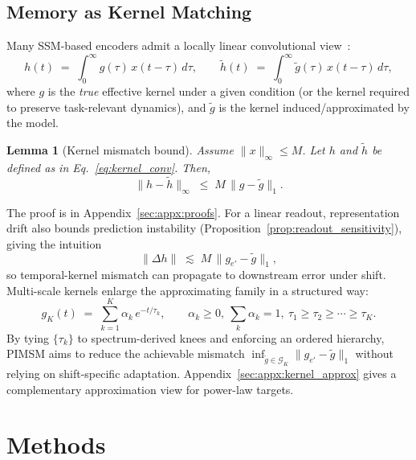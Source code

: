 \documentclass{article}
\newtheorem{lemma}{Lemma}
\begin{document}
\subsection{Memory as Kernel Matching}
\label{sec:theory:kernelbound}

Many SSM-based encoders admit a locally linear convolutional view~\citep{gu2021efficiently,gu2023mamba}:
\begin{equation}
h(t) \;=\; \int_{0}^{\infty} g(\tau)\, x(t-\tau)\, d\tau,
\qquad
\tilde h(t) \;=\; \int_{0}^{\infty} \tilde g(\tau)\, x(t-\tau)\, d\tau,
\label{eq:kernel_conv}
\end{equation}
where $g$ is the \emph{true} effective kernel under a given condition (or the kernel required to preserve task-relevant dynamics), and $\tilde g$ is the kernel induced/approximated by the model.

\begin{lemma}[Kernel mismatch bound]
\label{lem:kernel_mismatch}
Assume $\|x\|_{\infty}\le M$.
Let $h$ and $\tilde h$ be defined as in Eq.~\eqref{eq:kernel_conv}.
Then,
\begin{equation}
\|h - \tilde h\|_{\infty} \;\le\; M\, \|g - \tilde g\|_{1}.
\label{eq:kernel_mismatch_bound}
\end{equation}
\end{lemma}

The proof is in Appendix~\ref{sec:appx:proofs}.
For a linear readout, representation drift also bounds prediction instability (Proposition~\ref{prop:readout_sensitivity}), giving the intuition
\begin{equation}
\|\Delta h\| \;\lesssim\; M\,\|g_{e'} - \tilde g\|_{1},
\label{eq:chain_kernel_to_pred}
\end{equation}
so temporal-kernel mismatch can propagate to downstream error under shift.
Multi-scale kernels enlarge the approximating family in a structured way:
\begin{equation}
g_K(t) \;=\; \sum_{k=1}^{K} \alpha_k\, e^{-t/\tau_k},
\qquad \alpha_k\ge 0,\ \sum_k \alpha_k=1,\ \tau_1 \ge \tau_2 \ge \cdots \ge \tau_K.
\label{eq:mixture_exp_kernel}
\end{equation}
By tying $\{\tau_k\}$ to spectrum-derived knees and enforcing an ordered hierarchy, PIMSM aims to reduce the achievable mismatch $\inf_{\tilde g \in \mathcal{G}_K}\|g_{e'}-\tilde g\|_1$ without relying on shift-specific adaptation.
Appendix~\ref{sec:appx:kernel_approx} gives a complementary approximation view for power-law targets.

\section{Methods}
\label{sec:methods}
\end{document}
